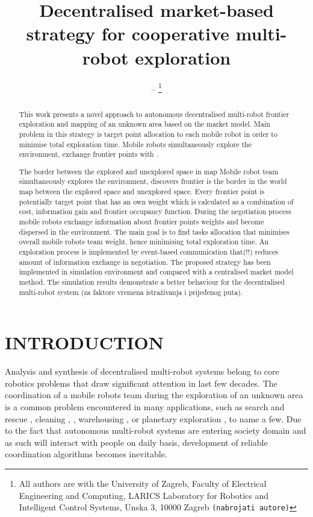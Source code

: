 \documentclass[letterpaper, 10 pt, conference]{ieeeconf}  %
\title{\LARGE \bf
Decentralised market-based strategy for cooperative multi-robot exploration 
}
\author{--%
\thanks{ All authors are with the University of Zagreb, Faculty of Electrical Engineering and Computing, LARICS Laboratory for Robotics and Intelligent Control Systems, Unska 3, 10000 Zagreb
 {\tt\small (nabrojati autore)}}%
}
\begin{document}
\maketitle
\thispagestyle{empty}
\pagestyle{empty}


\begin{abstract}

This work presents a novel approach to autonomous decentralised multi-robot frontier exploration and mapping of an unknown area based on the market model. Main problem in this strategy is target point allocation to each mobile robot in order to minimise total exploration time. Mobile robots simultaneously explore the environment, exchange frontier points with . 

The border between the explored and unexplored space in map Mobile robot team simultaneously explores the environment, discovers frontier  is the   border   in   the   world   map   between   the   explored   space and  unexplored  space.  Every frontier point is potentially target point that has an own weight which is calculated as a combination of cost, information gain and frontier occupancy function. During the negotiation process mobile robots exchange information about frontier points weights and become dispersed in the environment. The main goal is to find tasks allocation that minimises overall mobile robots team weight, hence minimising total exploration time. 
An exploration process is implemented by event-based communication that(!!) reduces amount of information exchange in negotiation. The proposed strategy has been implemented in simulation environment and compared with a centralised market model method. The simulation results demonstrate
a better behaviour for the decentralised multi-robot system (za faktore vremena istraživanja i prijeđenog puta). 

\end{abstract}

 
\section{INTRODUCTION}
Analysis and synthesis of decentralised multi-robot systems belong to core robotics problems that draw significant attention in last few decades. The coordination of a mobile robots team during the exploration of an unknown area is a common problem encountered in many applications, such as search and rescue \cite{rescue}, cleaning \cite{cleaning1}, \cite{cleaning2}, warehousing \cite{Wurman}, or planetary exploration \cite{planetary}, to name a few. Due to the fact that autonomous multi-robot systems are entering society domain and as such will interact with people on daily basis, development of reliable coordination algorithms becomes inevitable.
\end{document}
